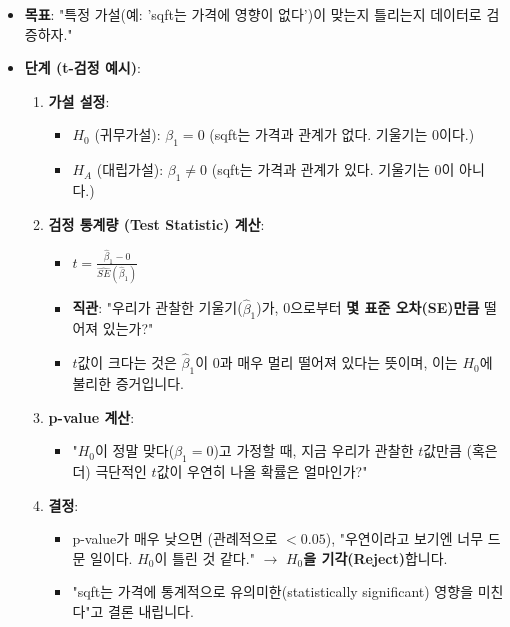\documentclass[11pt,a4paper]{book}
\theoremstyle{definition}
\begin{document}
\begin{itemize}
    \item \textbf{목표}: "특정 가설(예: 'sqft는 가격에 영향이 없다')이 맞는지 틀리는지 데이터로 검증하자."
    \item \textbf{단계 (t-검정 예시)}:
        \begin{enumerate}
            \item \textbf{가설 설정}:
                \begin{itemize}
                    \item $H_0$ (귀무가설): $\beta_1 = 0$ (sqft는 가격과 관계가 없다. 기울기는 0이다.)
                    \item $H_A$ (대립가설): $\beta_1 \neq 0$ (sqft는 가격과 관계가 있다. 기울기는 0이 아니다.)
                \end{itemize}
            \item \textbf{검정 통계량 (Test Statistic) 계산}:
                \begin{itemize}
                    \item $t = \frac{\hat{\beta}_1 - 0}{\hat{SE}(\hat{\beta}_1)}$
                    \item \textbf{직관}: "우리가 관찰한 기울기($\hat{\beta}_1$)가, 0으로부터 \textbf{몇 표준 오차(SE)만큼} 떨어져 있는가?"
                    \item $t$값이 크다는 것은 $\hat{\beta}_1$이 0과 매우 멀리 떨어져 있다는 뜻이며, 이는 $H_0$에 불리한 증거입니다.
                \end{itemize}
            \item \textbf{p-value 계산}:
                \begin{itemize}
                    \item "$H_0$이 정말 맞다($\beta_1=0$)고 가정할 때, 지금 우리가 관찰한 $t$값만큼 (혹은 더) 극단적인 $t$값이 우연히 나올 확률은 얼마인가?"
                \end{itemize}
            \item \textbf{결정}:
                \begin{itemize}
                    \item p-value가 매우 낮으면 (관례적으로 $< 0.05$), "우연이라고 보기엔 너무 드문 일이다. $H_0$이 틀린 것 같다." $\to$ \textbf{$H_0$을 기각(Reject)}합니다.
                    \item "sqft는 가격에 통계적으로 유의미한(statistically significant) 영향을 미친다"고 결론 내립니다.
                \end{itemize}
        \end{enumerate}
\end{itemize}
\end{document}
